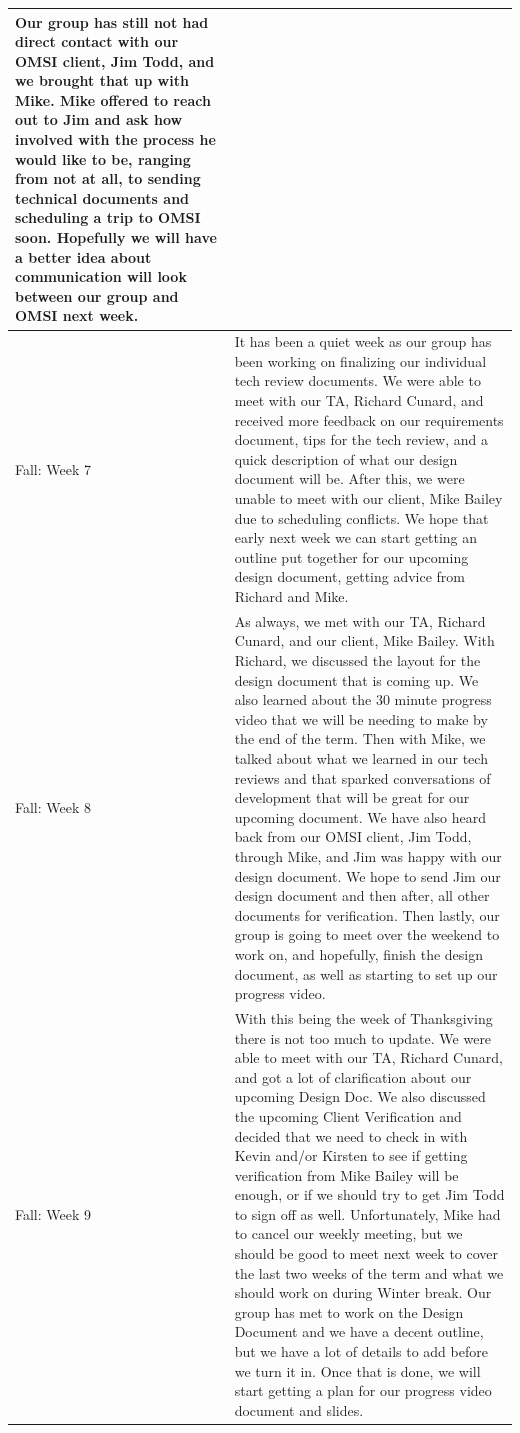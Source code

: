 \documentclass[onecolumn, draftclsnofoot,10pt, compsoc]{IEEEtran}
\begin{document}
\begin{longtable} {|p{1.5cm}|p{13.5cm}|}
Our group has still not had direct contact with our OMSI client, Jim Todd, and we brought that up with Mike. Mike offered to reach out to Jim and ask how involved with the process he would like to be, ranging from not at all, to sending technical documents and scheduling a trip to OMSI soon. Hopefully we will have a better idea about communication will look between our group and OMSI next week. \\ \hline

Fall: Week 7 & It has been a quiet week as our group has been working on finalizing our individual tech review documents. We were able to meet with our TA, Richard Cunard, and received more feedback on our requirements document, tips for the tech review, and a quick description of what our design document will be. After this, we were unable to meet with our client, Mike Bailey due to scheduling conflicts. We hope that early next week we can start getting an outline put together for our upcoming design document, getting advice from Richard and Mike. \\ \hline

Fall: Week 8 & 
As always, we met with our TA, Richard Cunard, and our client, Mike Bailey. With Richard, we discussed the layout for the design document that is coming up. We also learned about the 30 minute progress video that we will be needing to make by the end of the term. Then with Mike, we talked about what we learned in our tech reviews and that sparked conversations of development that will be great for our upcoming document. We have also heard back from our OMSI client, Jim Todd, through Mike, and Jim was happy with our design document. We hope to send Jim our design document and then after, all other documents for verification. Then lastly, our group is going to meet over the weekend to work on, and hopefully, finish the design document, as well as starting to set up our progress video. \\ \hline

Fall: Week 9 & 
With this being the week of Thanksgiving there is not too much to update. We were able to meet with our TA, Richard Cunard, and got a lot of clarification about our upcoming Design Doc. We also discussed the upcoming Client Verification and decided that we need to check in with Kevin and/or Kirsten to see if getting verification from Mike Bailey will be enough, or if we should try to get Jim Todd to sign off as well. Unfortunately, Mike had to cancel our weekly meeting, but we should be good to meet next week to cover the last two weeks of the term and what we should work on during Winter break. Our group has met to work on the Design Document and we have a decent outline, but we have a lot of details to add before we turn it in. Once that is done, we will start getting a plan for our progress video document and slides. \\ \hline


\end{longtable}
\end{document}
